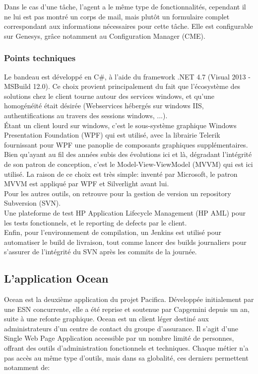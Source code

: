 \documentclass{rapport}
\begin{document}
Dans le cas d'une tâche, l'agent a le même type de fonctionnalités, cependant il ne lui est pas montré un corps de mail, mais plutôt un formulaire complet correspondant aux informations nécessaires pour cette tâche. Elle est configurable sur Genesys, grâce notamment au Configuration Manager (CME).

\subsubsection{Points techniques}

Le bandeau est développé en C\#, à l'aide du framework .NET 4.7 (Visual 2013 - MSBuild 12.0). Ce choix provient principalement du fait que l'écosystème des solutions chez le client tourne autour des services windows, et qu'une homogénéité était désirée (Webservices hébergés sur windows IIS, authentifications au travers des sessions windows, ...).\\
Étant un client lourd sur windows, c'est le sous-système graphique Windows Presentation Foundation (WPF) qui est utilisé, avec la librairie Telerik fournissant pour WPF une panoplie de composants graphiques supplémentaires.\\

Bien qu'ayant au fil des années subis des évolutions ici et là, dégradant l'intégrité de son patron de conception, c'est le Model-View-ViewModel (MVVM) qui est ici utilisé. La raison de ce choix est très simple: inventé par Microsoft, le patron MVVM est appliqué par WPF et Silverlight avant lui.\\

Pour les autres outils, on retrouve pour la gestion de version un repository Subversion (SVN).\\
Une plateforme de test HP Application Lifecycle Management (HP AML) pour les tests fonctionnels, et le reporting de defects par le client.\\
Enfin, pour l'environnement de compilation, un Jenkins est utilisé pour automatiser le build de livraison, tout comme lancer des builds journaliers pour s'assurer de l'intégrité du SVN après les commits de la journée.

\subsection{L'application Ocean}

Ocean est la deuxième application du projet Pacifica. Développée initialement par une ESN concurrente, elle a été reprise et soutenue par Capgemini depuis un an, suite à une refonte graphique. Ocean est un client léger destiné aux administrateurs d'un centre de contact du groupe d'assurance. Il s'agit d'une Single Web Page Application accessible par un nombre limité de personnes, offrant des outils d'administration fonctionnels et techniques. Chaque métier n'a pas accès au même type d'outils, mais dans sa globalité, ces derniers permettent notamment de:\\
\end{document}

